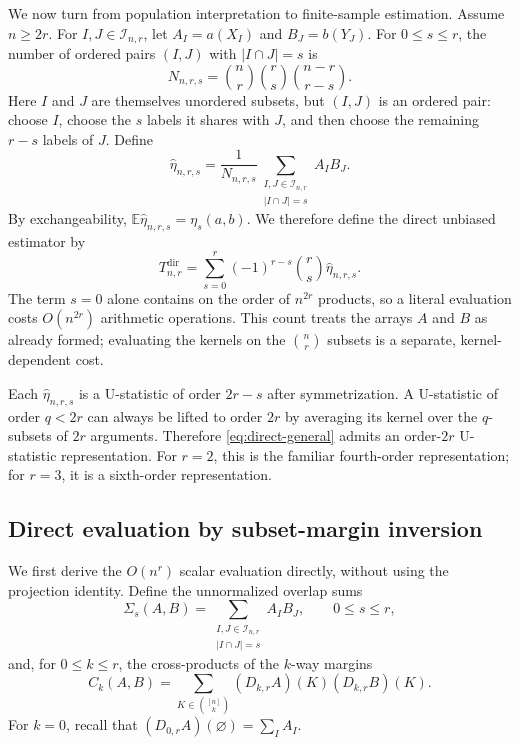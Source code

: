 \documentclass[11pt]{article}
\theoremstyle{plain}
\theoremstyle{definition}
\theoremstyle{remark}
\newcommand{\E}{\mathbb E}
\newcommand{\cI}{\mathcal I}
\begin{document}
We now turn from population interpretation to finite-sample estimation.
Assume $n\ge2r$.  For $I,J\in\cI_{n,r}$, let $A_I=a(X_I)$ and
$B_J=b(Y_J)$.  For $0\le s\le r$, the number of ordered pairs $(I,J)$ with
$|I\cap J|=s$ is
\begin{equation}\label{eq:N-s}
 N_{n,r,s}
 =\binom nr\binom rs\binom{n-r}{r-s}.
\end{equation}
Here $I$ and $J$ are themselves unordered subsets, but $(I,J)$ is an ordered
pair: choose $I$, choose the $s$ labels it shares with $J$, and then choose
the remaining $r-s$ labels of $J$.
Define
\begin{equation}\label{eq:eta-s-hat}
 \widehat\eta_{n,r,s}
 =\frac{1}{N_{n,r,s}}
  \sum_{\substack{I,J\in\cI_{n,r}\\|I\cap J|=s}}A_I B_J.
\end{equation}
By exchangeability, $\E\widehat\eta_{n,r,s}=\eta_s(a,b)$.  We therefore define
the direct unbiased estimator by
\begin{equation}\label{eq:direct-general}
 T_{n,r}^{\mathrm{dir}}
 =\sum_{s=0}^r(-1)^{r-s}\binom rs
  \widehat\eta_{n,r,s}.
\end{equation}
The term $s=0$ alone contains on the order of $n^{2r}$ products, so a literal
evaluation costs $O(n^{2r})$ arithmetic operations.  This count treats the
arrays $A$ and $B$ as already formed; evaluating the kernels on the
$\binom nr$ subsets is a separate, kernel-dependent cost.

Each $\widehat\eta_{n,r,s}$ is a U-statistic of order $2r-s$ after
symmetrization.  A U-statistic of order $q<2r$ can always be lifted to order
$2r$ by averaging its kernel over the $q$-subsets of $2r$ arguments.
Therefore \eqref{eq:direct-general} admits an order-$2r$ U-statistic
representation.  For $r=2$, this is the familiar fourth-order representation;
for $r=3$, it is a sixth-order representation.


\subsection{Direct evaluation by subset-margin inversion}
We first derive the $O(n^r)$ scalar evaluation directly, without using the
projection identity.  Define the unnormalized overlap sums
\begin{equation*}
 \Sigma_s(A,B)
 =\sum_{\substack{I,J\in\cI_{n,r}\\|I\cap J|=s}}A_I B_J,
 \qquad 0\le s\le r,
\end{equation*}
and, for $0\le k\le r$, the cross-products of the $k$-way margins
\begin{equation}\label{eq:Ck-margin}
 C_k(A,B)
 =\sum_{K\in\binom{[n]}k}
   (D_{k,r}A)(K)(D_{k,r}B)(K).
\end{equation}
For $k=0$, recall that $(D_{0,r}A)(\varnothing)=\sum_I A_I$.
\end{document}
